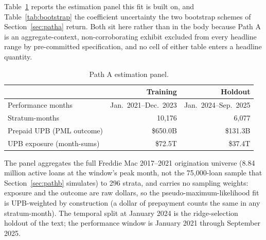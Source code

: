\documentclass[12pt]{article}
\begin{document}
Table~\ref{tab:panel} reports the estimation panel this fit is built on, and Table~\ref{tab:bootstrap} the coefficient uncertainty the two bootstrap schemes of Section~\ref{sec:patha} return. Both sit here rather than in the body because Path A is an aggregate-context, non-corroborating exhibit excluded from every headline range by pre-committed specification, and no cell of either table enters a headline quantity.

\begin{table}[H]
\centering
\small
\begin{threeparttable}
\caption{Path A estimation panel.}
\label{tab:panel}
\begin{tabular}{@{}lrr@{}}
\toprule
 & Training & Holdout \\
\midrule
Performance months & Jan.\ 2021--Dec.\ 2023 & Jan.\ 2024--Sep.\ 2025 \\
Stratum-months & 10,176 & 6,077 \\
Prepaid UPB (PML outcome) & \$650.0B & \$131.3B \\
UPB exposure (month-sums) & \$72.5T & \$37.4T \\
\bottomrule
\end{tabular}
\begin{tablenotes}[flushleft]\footnotesize
\item The panel aggregates the full Freddie Mac 2017--2021 origination universe (8.84 million active loans at the window's peak month, not the 75,000-loan sample that Section~\ref{sec:pathb} simulates) to 296 strata, and carries no sampling weights: exposure and the outcome are raw dollars, so the pseudo-maximum-likelihood fit is UPB-weighted by construction (a dollar of prepayment counts the same in any stratum-month). The temporal split at January 2024 is the ridge-selection holdout of the text; the performance window is January 2021 through September 2025.
\end{tablenotes}
\end{threeparttable}
\end{table}
\end{document}
